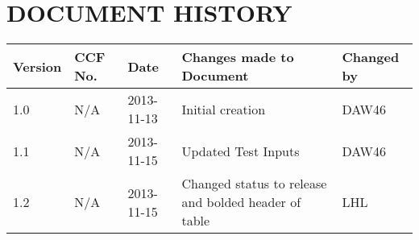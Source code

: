 \documentclass{project}
\begin{document}



\section*{DOCUMENT HISTORY}
\begin{flushleft}
\begin{tabular}{ | p{1.5cm} | p{1cm} | p{2cm} | p{6cm}| p{1.5cm}| }
\hline
Version & CCF No. & Date & Changes made to Document & Changed by \\
\hline

1.0 & N/A & 2013-11-13 & Initial creation & DAW46 \\ \hline
1.1 & N/A & 2013-11-15 & Updated Test Inputs & DAW46 \\ \hline
1.2 & N/A & 2013-11-15 & Changed status to release and bolded header of table & LHL \\ \hline

\end{tabular}
\end{flushleft}
\label{thelastpage}
\end{document}
